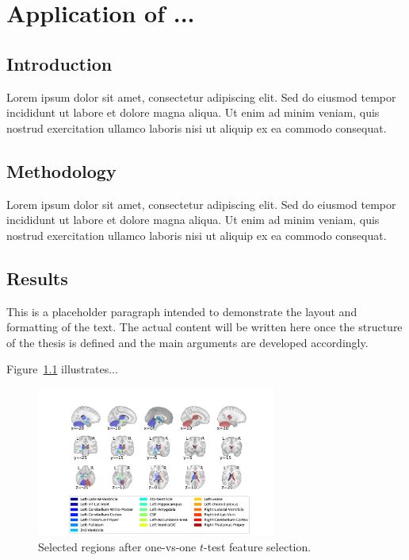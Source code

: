 
\chapter{Application of ...}\label{chap_04}
\minitoc
\setcounter{algocf}{0} %
\renewcommand{\thealgocf}{\thechapter.\arabic{algocf}} %

\vspace{1cm}


\section{Introduction}

Lorem ipsum dolor sit amet, consectetur adipiscing elit. Sed do eiusmod tempor incididunt ut labore et dolore magna aliqua. Ut enim ad minim veniam, quis nostrud exercitation ullamco laboris nisi ut aliquip ex ea commodo consequat.



\section{Methodology}

Lorem ipsum dolor sit amet, consectetur adipiscing elit. Sed do eiusmod tempor incididunt ut labore et dolore magna aliqua. Ut enim ad minim veniam, quis nostrud exercitation ullamco laboris nisi ut aliquip ex ea commodo consequat.


\section{Results}

This is a placeholder paragraph intended to demonstrate the layout and formatting of the text. The actual content will be written here once the structure of the thesis is defined and the main arguments are developed accordingly.

Figure~\ref{fig:regions} illustrates...

\begin{figure}[!h]
  \centering
 \includegraphics[width=0.7\textwidth]{Figures/chap_04/ROI7}
\caption{Selected regions after one-vs-one $t$-test feature selection.}\label{fig:regions}
\end{figure}

